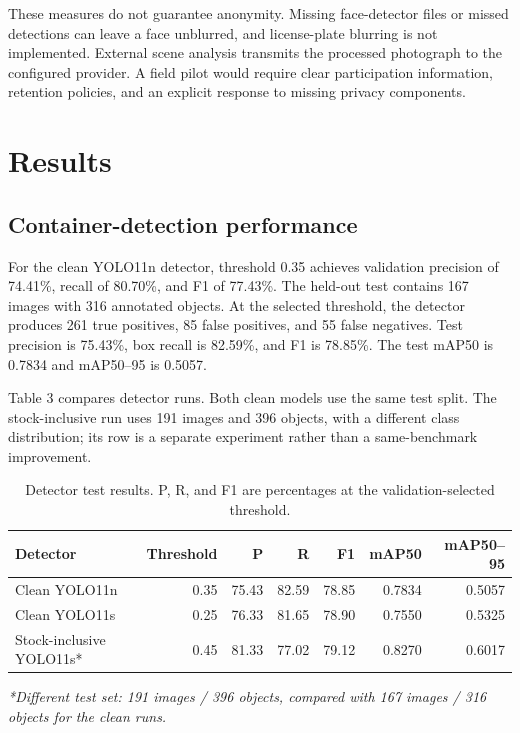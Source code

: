 \documentclass[a4paper,11pt]{article}
\begin{document}
These measures do not guarantee anonymity. Missing face-detector files or missed detections can leave a face unblurred, and license-plate blurring is not implemented. External scene analysis transmits the processed photograph to the configured provider. A field pilot would require clear participation information, retention policies, and an explicit response to missing privacy components.

\section{Results}

\subsection{Container-detection performance}

For the clean YOLO11n detector, threshold 0.35 achieves validation precision of 74.41\%, recall of 80.70\%, and F1 of 77.43\%. The held-out test contains 167 images with 316 annotated objects. At the selected threshold, the detector produces 261 true positives, 85 false positives, and 55 false negatives. Test precision is 75.43\%, box recall is 82.59\%, and F1 is 78.85\%. The test mAP50 is 0.7834 and mAP50–95 is 0.5057.

Table 3 compares detector runs. Both clean models use the same test split. The stock-inclusive run uses 191 images and 396 objects, with a different class distribution; its row is a separate experiment rather than a same-benchmark improvement.

\begin{table}[!htbp]
\centering
\caption{Detector test results. P, R, and F1 are percentages at the validation-selected threshold.}
\label{tab:3}
\fontsize{9.5}{11.5}\selectfont
\setlength{\tabcolsep}{4.3pt}
\renewcommand{\arraystretch}{1.18}
\begin{tabularx}{\linewidth}{@{}>{\raggedright\arraybackslash}Xrrrrrr@{}}
\toprule
\textbf{Detector} & \textbf{Threshold} & \textbf{P} & \textbf{R} & \textbf{F1} & \textbf{mAP50} & \textbf{mAP50–95} \\
\midrule
Clean YOLO11n & 0.35 & 75.43 & 82.59 & 78.85 & 0.7834 & 0.5057 \\
Clean YOLO11s & 0.25 & 76.33 & 81.65 & 78.90 & 0.7550 & 0.5325 \\
Stock-inclusive YOLO11s* & 0.45 & 81.33 & 77.02 & 79.12 & 0.8270 & 0.6017 \\
\bottomrule
\end{tabularx}
\par\vspace{4pt}
\begin{minipage}{\linewidth}
\small\textit{*Different test set: 191 images / 396 objects, compared with 167 images / 316 objects for the clean runs.}
\end{minipage}
\end{table}
\end{document}
